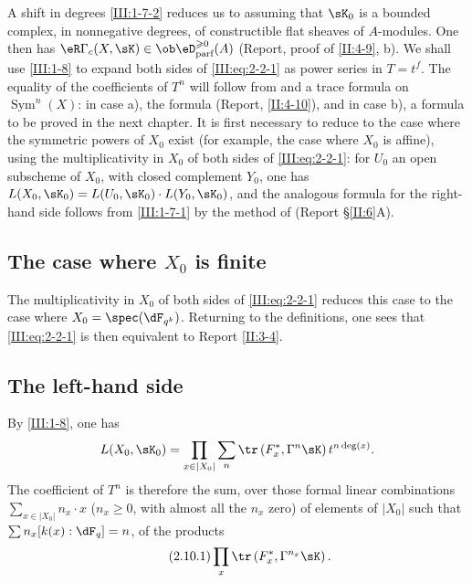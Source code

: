 A shift in degrees \ref{III:1-7-2} reduces us to assuming that $\sK_0$ is a
bounded complex, in nonnegative degrees, of constructible flat sheaves of
$A$-modules. One then has
$\eR\Gamma_c(X,\sK)\in \ob\eD_\text{parf}^{\geqslant 0}(A)$ (Report, proof of
\ref{II:4-9}, b). We shall use \ref{III:1-8} to expand both sides of
\eqref{III:eq:2-2-1} as power series in $T=t^f$. The equality of the
coefficients of $T^n$ will follow from  and a trace
formula on $\operatorname{Sym}^n(X)$: in case a), the formula (Report,
\ref{II:4-10}), and in case b), a formula to be proved in the next chapter.
It is first necessary to reduce to the case where the symmetric powers of
$X_0$ exist (for example, the case where $X_0$ is affine), using the
multiplicativity in $X_0$ of both sides of \eqref{III:eq:2-2-1}: for $U_0$ an
open subscheme of $X_0$, with closed complement $Y_0$, one has
$L(X_0,\sK_0)=L(U_0,\sK_0)\cdot L(Y_0,\sK_0)$, and the analogous formula for
the right-hand side follows from \ref{III:1-7-1} by the method of (Report
\S\ref{II:6}A).






\subsection{The case where $X_0$ is finite}\label{III:2-9}

The multiplicativity in $X_0$ of both sides of \eqref{III:eq:2-2-1} reduces
this case to the case where $X_0=\spec(\dF_{q^k})$. Returning to the
definitions, one sees that \eqref{III:eq:2-2-1} is then equivalent to Report
\ref{II:3-4}.






\subsection{The left-hand side}\label{III:2-10}

By \ref{III:1-8}, one has
\[
  L(X_0,\sK_0) = \prod_{x\in |X_0|} \sum_n \tr\left(F_x^*,\Gamma^n\sK\right) t^{n\deg(x)} \text{.}
\]
The coefficient of $T^n$ is therefore the sum, over those formal linear
combinations $\sum_{x\in |X_0|} n_x\cdot x$ ($n_x\geqslant 0$, with almost
all the $n_x$ zero) of elements of $|X_0|$ such that
$\sum n_x [k(x):\dF_q] = n$, of the products
\begin{equation*}\tag{2.10.1}\label{III:eq:2-10-1}
  \prod_x \tr\left(F_x^*,\Gamma^{n_x} \sK\right) \text{.}
\end{equation*}

